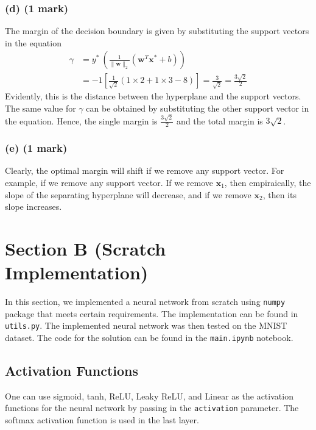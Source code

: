 \documentclass[12pt]{article}
\begin{document}
    \subsubsection*{(d) (1 mark)}
    The margin of the decision boundary is given by substituting the support vectors
    in the equation
    \begin{align}
        \label{eq:margin}
        \gamma &= y^{*} \ \left( \frac{1}{\lVert \mathbf{w} \rVert_{2}} \left( \mathbf{w}^T \mathbf{x}^{*} + b \right) \right) \\
        &= -1 \left[ \frac{1}{\sqrt{2}} (1 \times 2 + 1 \times 3 - 8) \right] = \frac{3}{\sqrt{2}} = \frac{3\sqrt{2}}{2} \nonumber
    \end{align}
    Evidently, this is the distance between the hyperplane and the support vectors. The
    same value for $\gamma$ can be obtained by substituting the other support vector in the equation.
    Hence, the single margin is $\frac{3\sqrt{2}}{2}$ and the total margin is $3\sqrt{2}$.

    \subsubsection*{(e) (1 mark)}
    Clearly, the optimal margin will shift if we remove any support vector. For example,
    if we remove any support vector. If we remove $\mathbf{x}_{1}$, then empiraically,
    the slope of the separating hyperplane will decrease, and if we remove $\mathbf{x}_{2}$,
    then its slope increases.

    \section{Section B (Scratch Implementation)}
    In this section, we implemented a neural network from scratch using \texttt{numpy} package
    that meets certain requirements. The implementation can be found in \texttt{utils.py}. The
    implemented neural network was then tested on the MNIST dataset. The code for the solution
    can be found in the \texttt{main.ipynb} notebook.

    \subsection*{Activation Functions}
    One can use sigmoid, tanh, ReLU, Leaky ReLU, and Linear as the activation functions for the
    neural network by passing in the \texttt{activation} parameter. The softmax activation function
    is used in the last layer.
\end{document}
